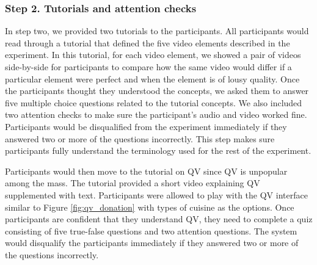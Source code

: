 \subsubsection{Step 2. Tutorials and attention checks}
In step two, we provided two tutorials to the participants. All participants would read through a tutorial that defined the five video elements described in the experiment. In this tutorial, for each video element, we showed a pair of videos side-by-side for participants to compare how the same video would differ if a particular element were perfect and when the element is of lousy quality. Once the participants thought they understood the concepts, we asked them to answer five multiple choice questions related to the tutorial concepts. We also included two attention checks to make sure the participant's audio and video worked fine. Participants would be disqualified from the experiment immediately if they answered two or more of the questions incorrectly. This step makes sure participants fully understand the terminology used for the rest of the experiment.

Participants would then move to the tutorial on QV since QV is unpopular among the mass. The tutorial provided a short video explaining QV supplemented with text. Participants were allowed to play with the QV interface similar to Figure \ref{fig:qv_donation} with types of cuisine as the options. Once participants are confident that they understand QV, they need to complete a quiz consisting of five true-false questions and two attention questions. The system would disqualify the participants immediately if they answered two or more of the questions incorrectly.

